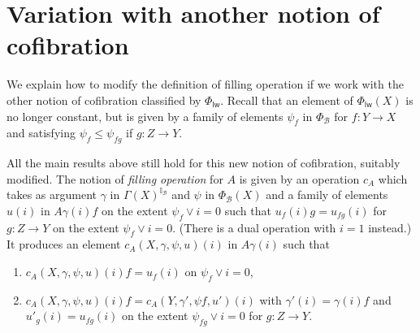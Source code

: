 \documentclass[10pt,a4paper,draft]{article}
\newcommand{\II}{\mathbb{I}}
\newcommand{\BB}{\mathcal{B}}
\renewcommand{\~}{\widetilde}
\newcommand{\levelwise}{\mathsf{lw}}
\newcommand{\cofuniv}{\Phi}
\newcommand{\cofunivLW}{\Phi_{\levelwise}}
\theoremstyle{definition}
\theoremstyle{remark} %
\begin{document}



\section{Variation with another notion of cofibration} \label{sec:variation}

We explain how to modify the definition of filling operation if we
work with the other notion of cofibration classified by $\cofunivLW$.
Recall that an element of $\cofunivLW(X)$
is no longer constant, but
is given by a family of elements  $\psi_f$ in $\cofuniv_{\BB}$ for $f:Y\rightarrow X$ and
satisfying $\psi_{f}\leqslant \psi_{f g}$ if $g:Z\rightarrow Y$.

All the main results above still hold for this new notion of cofibration,
suitably modified.
The notion of {\em filling operation}
for $A$ is given by an operation $c_A$ which takes as
argument $\gamma$ in $\Gamma(X)^{\II_{\BB}}$ and $\psi$ in $\cofuniv_\BB(X)$
and a family of elements $u(i)$ in $A\gamma(i)f$ on the extent
$\psi_f \vee i = 0$ such that $u_f(i)g = u_{fg}(i)$  for $g:Z\rightarrow Y$
on the extent
$\psi_f \vee i = 0$.
(There is a dual operation with $i=1$ instead.)
It produces an element $c_A(X,\gamma,\psi,u)(i)$ in $A\gamma(i)$
such that

\begin{enumerate}
  \item $c_A(X,\gamma,\psi,u)(i)f = u_f(i)$ on $\psi_f\vee i=0$,
  \item $c_A(X,\gamma,\psi,u)(i)f = c_A(Y,\gamma',\psi f,u')(i)$ with
    $\gamma'(i) = \gamma(i)f$ and $u'_g(i) = u_{fg}(i)$ on the extent
    $\psi_{fg}\vee i=0$ for $g:Z\rightarrow Y$.
\end{enumerate}
\end{document}
